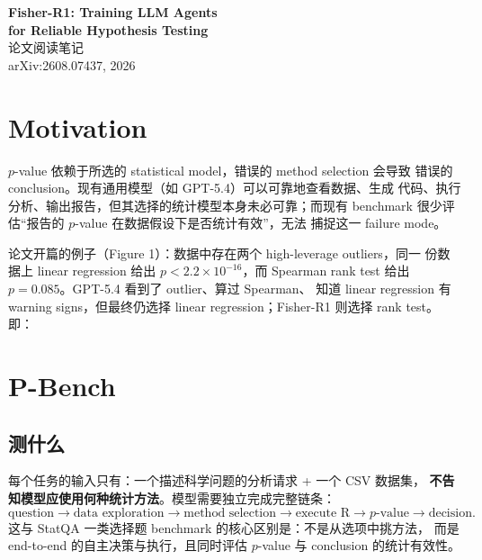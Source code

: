 \documentclass[12pt]{ctexart}
\begin{document}
\begin{center}
  {\LARGE\bfseries Fisher-R1: Training LLM Agents\\for Reliable Hypothesis Testing}\\[6pt]
  {\large 论文阅读笔记}\\[4pt]
  arXiv:2608.07437, 2026
\end{center}

\medskip

\section{Motivation}

$p$-value 依赖于所选的 statistical model，错误的 method selection 会导致
错误的 conclusion。现有通用模型（如 GPT-5.4）可以可靠地查看数据、生成
代码、执行分析、输出报告，但其选择的统计模型本身未必可靠；而现有
benchmark 很少评估``报告的 $p$-value 在数据假设下是否统计有效''，无法
捕捉这一 failure mode。

论文开篇的例子（Figure 1）：数据中存在两个 high-leverage outliers，同一
份数据上 linear regression 给出 $p < 2.2\times 10^{-16}$，而 Spearman
rank test 给出 $p = 0.085$。GPT-5.4 看到了 outlier、算过 Spearman、
知道 linear regression 有 warning signs，但最终仍选择 linear
regression；Fisher-R1 则选择 rank test。即：

\begin{center}
\end{center}

\section{P-Bench}

\subsection{测什么}

每个任务的输入只有：一个描述科学问题的分析请求 + 一个 CSV 数据集，
\textbf{不告知模型应使用何种统计方法}。模型需要独立完成完整链条：
\[
  \text{question}
  \rightarrow \text{data exploration}
  \rightarrow \text{method selection}
  \rightarrow \text{execute R}
  \rightarrow p\text{-value}
  \rightarrow \text{decision}.
\]
这与 StatQA 一类选择题 benchmark 的核心区别是：不是从选项中挑方法，
而是 end-to-end 的自主决策与执行，且同时评估 $p$-value 与 conclusion
的统计有效性。
\end{document}
